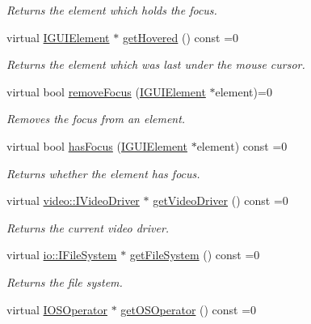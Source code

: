 \begin{DoxyCompactItemize}
\begin{DoxyCompactList}\small\item\em Returns the element which holds the focus. \end{DoxyCompactList}\item 
virtual \hyperlink{classirr_1_1gui_1_1IGUIElement}{I\+G\+U\+I\+Element} $\ast$ \hyperlink{classirr_1_1gui_1_1IGUIEnvironment_a00fa645d517a276553b78fc1d0e78591}{get\+Hovered} () const =0
\begin{DoxyCompactList}\small\item\em Returns the element which was last under the mouse cursor. \end{DoxyCompactList}\item 
virtual bool \hyperlink{classirr_1_1gui_1_1IGUIEnvironment_ab2100753b415a9950d95572d4623bf46}{remove\+Focus} (\hyperlink{classirr_1_1gui_1_1IGUIElement}{I\+G\+U\+I\+Element} $\ast$element)=0
\begin{DoxyCompactList}\small\item\em Removes the focus from an element. \end{DoxyCompactList}\item 
virtual bool \hyperlink{classirr_1_1gui_1_1IGUIEnvironment_a88c483f30a0f35debed70e8e51836552}{has\+Focus} (\hyperlink{classirr_1_1gui_1_1IGUIElement}{I\+G\+U\+I\+Element} $\ast$element) const =0
\begin{DoxyCompactList}\small\item\em Returns whether the element has focus. \end{DoxyCompactList}\item 
virtual \hyperlink{classirr_1_1video_1_1IVideoDriver}{video\+::\+I\+Video\+Driver} $\ast$ \hyperlink{classirr_1_1gui_1_1IGUIEnvironment_a48f5e442f0a2074a531234ab83148fe2}{get\+Video\+Driver} () const =0
\begin{DoxyCompactList}\small\item\em Returns the current video driver. \end{DoxyCompactList}\item 
virtual \hyperlink{classirr_1_1io_1_1IFileSystem}{io\+::\+I\+File\+System} $\ast$ \hyperlink{classirr_1_1gui_1_1IGUIEnvironment_ad3ae4570702000e09cacdb663f0ec363}{get\+File\+System} () const =0
\begin{DoxyCompactList}\small\item\em Returns the file system. \end{DoxyCompactList}\item 
virtual \hyperlink{classirr_1_1IOSOperator}{I\+O\+S\+Operator} $\ast$ \hyperlink{classirr_1_1gui_1_1IGUIEnvironment_afc715b9a9d98ae3aa8e769c9fb2f4f31}{get\+O\+S\+Operator} () const =0

\end{DoxyCompactItemize}
